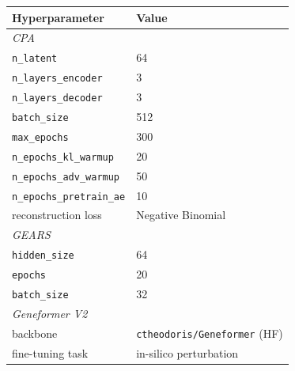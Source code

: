 \documentclass{article}
\theoremstyle{plain}
\theoremstyle{definition}
\theoremstyle{remark}
\begin{document}
\begin{table}[h]
\centering
\small
\begin{tabular}{ll}
\toprule
\textbf{Hyperparameter} & \textbf{Value} \\
\midrule
\multicolumn{2}{l}{\textit{CPA}~\citep{lotfollahi2023cpa}} \\
\hspace{1em}\texttt{n\_latent}                            & 64 \\
\hspace{1em}\texttt{n\_layers\_encoder}                   & 3 \\
\hspace{1em}\texttt{n\_layers\_decoder}                   & 3 \\
\hspace{1em}\texttt{batch\_size}                          & 512 \\
\hspace{1em}\texttt{max\_epochs}                          & 300 \\
\hspace{1em}\texttt{n\_epochs\_kl\_warmup}                & 20 \\
\hspace{1em}\texttt{n\_epochs\_adv\_warmup}               & 50 \\
\hspace{1em}\texttt{n\_epochs\_pretrain\_ae}              & 10 \\
\hspace{1em}reconstruction loss                           & Negative Binomial \\
\midrule
\multicolumn{2}{l}{\textit{GEARS}~\citep{roohani2024gears}} \\
\hspace{1em}\texttt{hidden\_size}                          & 64 \\
\hspace{1em}\texttt{epochs}                                & 20 \\
\hspace{1em}\texttt{batch\_size}                           & 32 \\
\midrule
\multicolumn{2}{l}{\textit{Geneformer V2}~\citep{theodoris2023geneformer}} \\
\hspace{1em}backbone                                       & \texttt{ctheodoris/Geneformer} (HF) \\
\hspace{1em}fine-tuning task                               & in-silico perturbation \\

\end{tabular}
\end{table}
\end{document}
